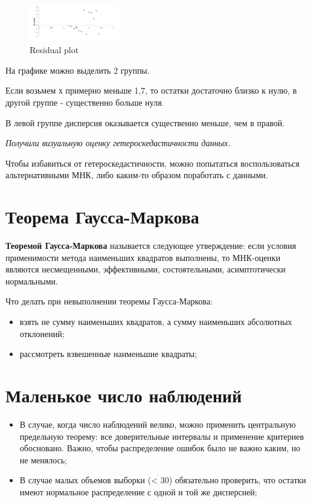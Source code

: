 \documentclass{article}
\begin{document}
\begin{figure}
    \centering
    \includegraphics[width=0.35\textwidth]{graph2.png}
    \caption[Optional caption]{Residual plot}
    \label{fig:graph2}
\end{figure}

На графике можно выделить 2 группы. 

Если возьмем х примерно меньше 1,7, то остатки достаточно близко к нулю, в другой группе - существенно больше нуля. 

В левой группе дисперсия оказывается существенно меньше, чем в правой. 

\textit{Получили визуальную оценку гетероскедастичности данных.}

Чтобы избавиться от гетероскедастичности, можно попытаться воспользоваться альтернативными МНК, либо каким-то образом поработать с данными.

\section{Теорема Гаусса-Маркова}\label{sec:g-m}
\textbf{Теоремой Гаусса-Маркова} называется следующее утверждение: если условия применимости метода наименьших квадратов выполнены, то МНК-оценки являются несмещенными, эффективными, состоятельными, асимптотически нормальными. 

Что делать при невыполнении теоремы Гаусса-Маркова:
\begin{itemize}
    \item взять не сумму наименьших квадратов, а сумму наименьших абсолютных отклонений;
    \item рассмотреть взвешенные наименьшие квадраты;
\end{itemize}

\section{Маленькое число наблюдений}\label{sec:g-m}
\begin{itemize}
    \item В случае, когда число наблюдений велико, можно применить центральную предельную теорему: все доверительные интервалы и применение критериев обосновано. Важно, чтобы распределение ошибок было не важно каким, но не менялось; \\
    \item В случае малых объемов выборки (< 30) обязательно проверить, что остатки имеют нормальное распределение с одной и той же дисперсией;
\end{itemize}
\end{document}
